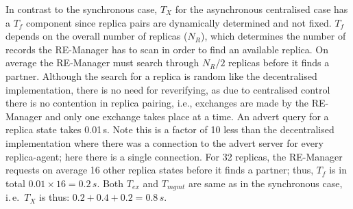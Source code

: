 \documentclass{rspublic}
\newcommand{\alnote}[1]{ {\textcolor{blue} { ***andre: #1 }}}
\newcommand{\athotanote}[1]{ {\textcolor{green} { ***athota: #1 }}}
\newcommand{\alnote}[1]{}
\newcommand{\athotanote}[1]{}
\begin{document}




In contrast to the synchronous case, $T_X$ for the asynchronous
centralised case has a $T_f$ component since replica pairs are
dynamically determined and not fixed. $T_f$ depends on the overall
number of replicas ($N_R$), which determines the number of records the
RE-Manager has to scan in order to find an available replica. On
average the RE-Manager must search through $N_R/2$ replicas before it
finds a partner. Although the search for a replica is random like the
decentralised implementation, there is no need for reverifying, as due
to centralised control there is no contention in replica pairing,
i.e., exchanges are made by the RE-Manager and only one exchange takes
place at a time.  An advert query for a replica state takes
0.01\,s. Note this is a factor of 10 less than the decentralised
implementation where there was a connection to the advert server for
every replica-agent; here there is a single connection. For 32
replicas, the RE-Manager requests on average 16 other replica states
before it finds a partner; thus, $T_f$ is in total
$0.01\times16=0.2\,s$. Both $T_{ex}$ and $T_{mgmt}$ are same as in the
synchronous case, i.\,e.\ $T_{X}$ is thus: $0.2+0.4+0.2=0.8\,s$.
\end{document}
